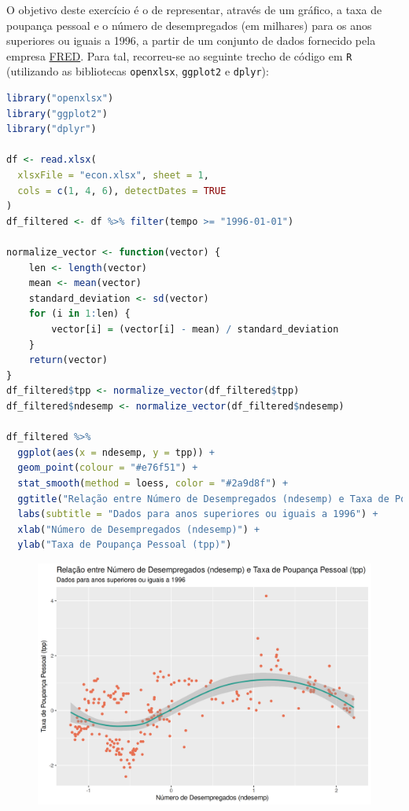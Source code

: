 \documentclass[12pt,a4paper]{article}
\begin{document}
O objetivo deste exercício é o de representar, através de um gráfico, a taxa de poupança pessoal e o número de desempregados (em milhares)
para os anos superiores ou iguais a 1996, a partir de um conjunto de dados fornecido pela empresa \href{https://fred.stlouisfed.org/}{FRED}.
Para tal, recorreu-se ao seguinte trecho de código em \texttt{R} (utilizando as bibliotecas \texttt{openxlsx}, \texttt{ggplot2} e \texttt{dplyr}):

\quad

\begin{lstlisting}[language=R]
library("openxlsx")
library("ggplot2")
library("dplyr")

df <- read.xlsx(
  xlsxFile = "econ.xlsx", sheet = 1,
  cols = c(1, 4, 6), detectDates = TRUE
)
df_filtered <- df %>% filter(tempo >= "1996-01-01")

normalize_vector <- function(vector) {
    len <- length(vector)
    mean <- mean(vector)
    standard_deviation <- sd(vector)
    for (i in 1:len) {
        vector[i] = (vector[i] - mean) / standard_deviation
    }
    return(vector)
}
df_filtered$tpp <- normalize_vector(df_filtered$tpp)
df_filtered$ndesemp <- normalize_vector(df_filtered$ndesemp)

df_filtered %>%
  ggplot(aes(x = ndesemp, y = tpp)) +
  geom_point(colour = "#e76f51") +
  stat_smooth(method = loess, color = "#2a9d8f") +
  ggtitle("Relação entre Número de Desempregados (ndesemp) e Taxa de Poupança Pessoal (tpp)") +
  labs(subtitle = "Dados para anos superiores ou iguais a 1996") +
  xlab("Número de Desempregados (ndesemp)") +
  ylab("Taxa de Poupança Pessoal (tpp)")
\end{lstlisting}

\quad

\begin{figure}[h]
  \centering
  \includegraphics[scale = 0.8]{./ex01.png}
\end{figure}
\end{document}
